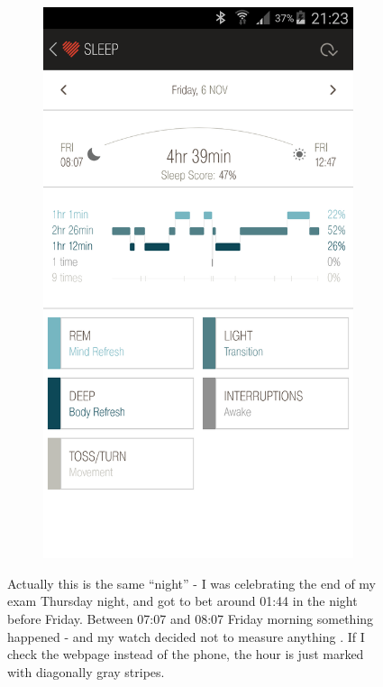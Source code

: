 \documentclass[12pt,a4paper]{article}
\begin{document}
\begin{figure}[H]
\begin{subfigure}[b]{0.5\textwidth}
     \end{subfigure}
    ~ %
    \begin{subfigure}[b]{0.5\textwidth}
        \includegraphics[width=\textwidth]{06-11-15.png}
    \end{subfigure}
\caption{Actually this is the same ``night'' - I was celebrating the end of my exam Thursday night, and got to bet around 01:44 in the night before Friday. Between 07:07 and 08:07 Friday morning something happened - and my watch decided not to measure anything	. If I check the webpage instead of the phone, the hour is just marked with diagonally gray stripes.}
\end{figure}
\end{document}
